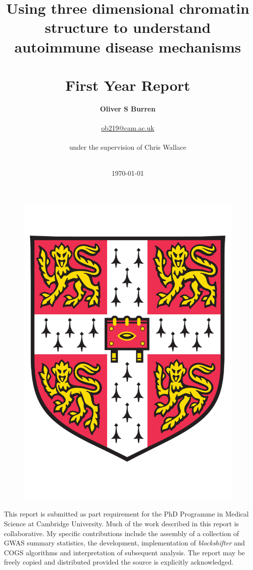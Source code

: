 \documentclass[a4paper,11pt]{report}
\title{\huge \textbf{Using three dimensional chromatin structure to understand autoimmune disease mechanisms} \\
\textbf{} \\
First Year Report}
\author{ \LARGE
 \textbf{Oliver S Burren}\\ \\
\LARGE \url{ob219@cam.ac.uk}\\ \\
\LARGE under the supervision of Chris Wallace \\ \\
}
\date{\huge \today}
\begin{document}
\begin{figure}
\centering
\includegraphics[width=0.3\linewidth]{UniCam.pdf}
\end{figure}




\maketitle

\thispagestyle{empty} 
\begin{small}
This report is submitted as part requirement for the  PhD Programme in Medical Science at Cambridge University. Much of the work described in this report is collaborative. My specific contributions  include the assembly of a collection of GWAS summary statistics, the  development, implementation of \textit{blockshifter} and COGS algorithms and interpretation of subsequent analysis.
The report may be freely copied and distributed provided the source is explicitly acknowledged.
\end{small}

\clearpage

\singlespacing
\end{document}
